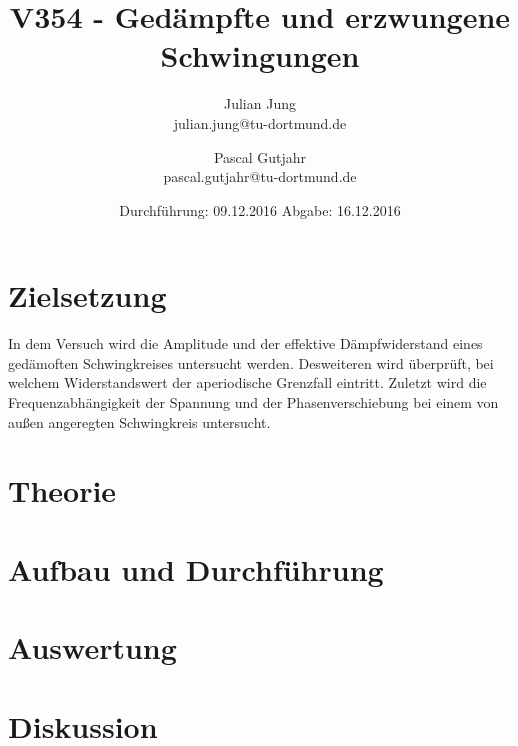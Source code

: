 

\title{V354 - Gedämpfte und erzwungene Schwingungen}
\author{Julian Jung \\ julian.jung@tu-dortmund.de
  \and Pascal Gutjahr \\ pascal.gutjahr@tu-dortmund.de}
  \date{Durchführung: 09.12.2016
  \hspace{3em}
  Abgabe: 16.12.2016}
  
\maketitle
\newpage
\tableofcontents
\newpage
\section{Zielsetzung}
In dem Versuch wird die Amplitude und der effektive Dämpfwiderstand eines
gedämoften Schwingkreises untersucht werden. Desweiteren wird überprüft, bei
welchem Widerstandswert der aperiodische Grenzfall eintritt. Zuletzt wird die
Frequenzabhängigkeit der Spannung und der Phasenverschiebung bei einem von
außen angeregten Schwingkreis untersucht.
\section{Theorie}
 
\section{Aufbau und Durchführung}
\section{Auswertung}
\section{Diskussion}
% 
\printbibliography

